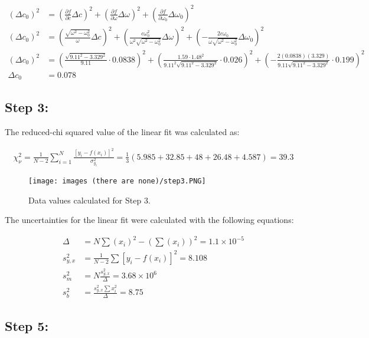 \documentclass[12pt, letterpaper, twoside]{article}
\begin{document}
\begin{align*}
    (\Delta c_0)^2 &= (\frac{\partial f}{\partial c}\Delta c)^2 + (\frac{\partial f}{\partial \omega}\Delta\omega)^2 + (\frac{\partial f}{\partial \omega_0}\Delta \omega_0)^2 \\
    (\Delta c_0)^2 &= (\frac{\sqrt{\omega^2 - \omega_0^2}}{\omega}\Delta c)^2 + (\frac{c\omega_0^2}{\omega^2\sqrt{\omega^2 - \omega_0^2}}\Delta\omega)^2 + (-\frac{2c\omega_0}{\omega\sqrt{\omega^2 - \omega_0^2}}\Delta\omega_0)^2 \\
    (\Delta c_0)^2 &= (\frac{\sqrt{9.11^2 - 3.329^2}}{9.11}\cdot 0.0838)^2 + (\frac{1.59 \cdot 1.48^2}{9.11^2\sqrt{9.11^2 - 3.329^2}}\cdot0.026)^2 + (-\frac{2(0.0838)(3.329)}{9.11\sqrt{9.11^2 - 3.329^2}}\cdot 0.199)^2\\
    \Delta c_0 &= 0.078
\end{align*}

\subsection{Step 3:}

The reduced-chi squared value of the linear fit was calculated as:

\begin{align*}
    \chi_\nu^2 = \frac{1}{N-2}\sum_{i=1}^N\frac{[y_i - f(x_i)]^2}{\sigma_{y_i}^2} = \frac{1}{3}(5.985+32.85+48+26.48+4.587) = 39.3
\end{align*}

\begin{figure}[!ht]
    \centering
    \texttt{[image: images (there are none)/step3.PNG]}
    \caption{Data values calculated for Step 3.}
    \label{fig:my_label}
\end{figure}

The uncertainties for the linear fit were calculated with the following equations:

\begin{align*}
    \Delta &= N\sum(x_i)^2 - (\sum(x_i))^2 = 1.1 \times 10^{-5} \\
    s_{y,x}^2 &= \frac{1}{N-2}\sum[y_i - f(x_i)]^2 = 8.108\\
    s_m^2 &= N\frac{s_{y,x}^2}{\Delta} = 3.68 \times 10^{6} \\
    s_b^2 &= \frac{s_{y,x}^2\sum x_i^2}{\Delta} = 8.75
\end{align*}

\subsection{Step 5:}
\end{document}
